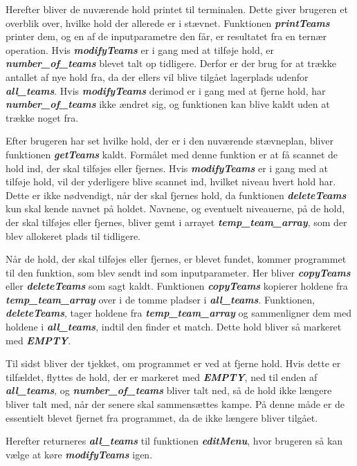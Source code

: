 \par
Herefter bliver de nuværende hold printet til terminalen. Dette giver brugeren et overblik over, hvilke hold der allerede er i stævnet. Funktionen \textbf{\textit{printTeams}} printer dem, og en af de inputparametre den får, er resultatet fra en ternær operation. Hvis \textbf{\textit{modifyTeams}} er i gang med at tilføje hold, er \textbf{\textit{number\_of\_teams}} blevet talt op tidligere. Derfor er der brug for at trække antallet af nye hold fra, da der ellers vil blive tilgået lagerplads udenfor \textbf{\textit{all\_teams}}. Hvis \textbf{\textit{modifyTeams}} derimod er i gang med at fjerne hold, har \textbf{\textit{number\_of\_teams}} ikke ændret sig, og funktionen kan blive kaldt uden at trække noget fra.
\par
Efter brugeren har set hvilke hold, der er i den nuværende stævneplan, bliver funktionen \textbf{\textit{getTeams}} kaldt. Formålet med denne funktion er at få scannet de hold ind, der skal tilføjes eller fjernes. Hvis \textbf{\textit{modifyTeams}} er i gang med at tilføje hold, vil der yderligere blive scannet ind, hvilket niveau hvert hold har. Dette er ikke nødvendigt, når der skal fjernes hold, da funktionen \textbf{\textit{deleteTeams}} kun skal kende navnet på holdet. Navnene, og eventuelt niveauerne, på de hold, der skal tilføjes eller fjernes, bliver gemt i arrayet \textbf{\textit{temp\_team\_array}}, som der blev allokeret plads til tidligere. 
\par
Når de hold, der skal tilføjes eller fjernes, er blevet fundet, kommer programmet til den funktion, som blev sendt ind som inputparameter. Her bliver \textbf{\textit{copyTeams}} eller \textbf{\textit{deleteTeams}} som sagt kaldt. Funktionen \textbf{\textit{copyTeams}} kopierer holdene fra \textbf{\textit{temp\_team\_array}} over i de tomme pladser i \textbf{\textit{all\_teams}}. Funktionen, \textbf{\textit{deleteTeams}}, tager holdene fra \textbf{\textit{temp\_team\_array}} og sammenligner dem med holdene i \textbf{\textit{all\_teams}}, indtil den finder et match. Dette hold bliver så markeret med \textbf{\textit{EMPTY}}.
\par
Til sidst bliver der tjekket, om programmet er ved at fjerne hold. Hvis dette er tilfældet, flyttes de hold, der er markeret med \textbf{\textit{EMPTY}}, ned til enden af \textbf{\textit{all\_teams}}, og \textbf{\textit{number\_of\_teams}} bliver talt ned, så de hold ikke længere bliver talt med, når der senere skal sammensættes kampe. På denne måde er de essentielt blevet fjernet fra programmet, da de ikke længere bliver tilgået. 
\par
Herefter returneres \textbf{\textit{all\_teams}} til funktionen \textbf{\textit{editMenu}}, hvor brugeren så kan vælge at køre \textbf{\textit{modifyTeams}} igen. 


